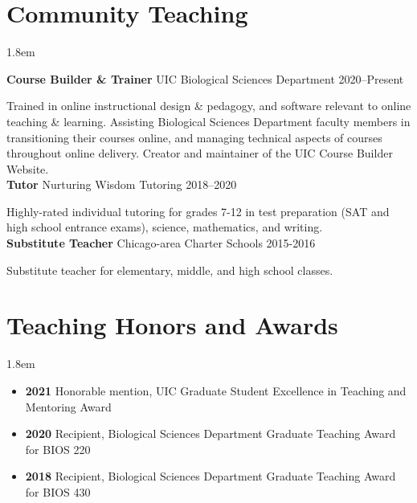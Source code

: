 \documentclass[]{article}
\begin{document}
\clearpage
\pagestyle{alldocument}

\section{Community Teaching}
\vspace{4mm}
\leftskip 1.8em

\textbf{Course Builder \& Trainer} UIC Biological Sciences Department \hfill 2020--Present
     
Trained in online instructional design \& pedagogy, and software relevant to online teaching \& \linebreak learning. Assisting Biological Sciences Department faculty members in transitioning their courses online, and managing technical aspects of courses throughout online delivery. Creator and maintainer of the UIC Course Builder Website. \href{https://www.ledelaney.org/cb-materials}{\faLink} \href{https://github.com/ledelaney/cb-materials}{\faGithub}\\
     
\textbf{Tutor} Nurturing Wisdom Tutoring \hfill 2018--2020
     
Highly-rated individual tutoring for grades 7-12 in test preparation (SAT and high school entrance \linebreak exams), science, mathematics, and writing.\\

\textbf{Substitute Teacher} Chicago-area Charter Schools \hfill 2015-2016
     
Substitute teacher for elementary, middle, and high school classes.

\section{Teaching Honors and Awards}

\vspace{4mm}
\leftskip 1.8em

\begin{itemize}[label=$\mathwitch*$]
\item{\textbf{2021} Honorable mention, UIC Graduate Student Excellence in Teaching and Mentoring Award}
\item{\textbf{2020} Recipient, Biological Sciences Department Graduate Teaching Award for BIOS 220}
\item{\textbf{2018} Recipient, Biological Sciences Department Graduate Teaching Award for BIOS 430}
\end{itemize}
\end{document}

